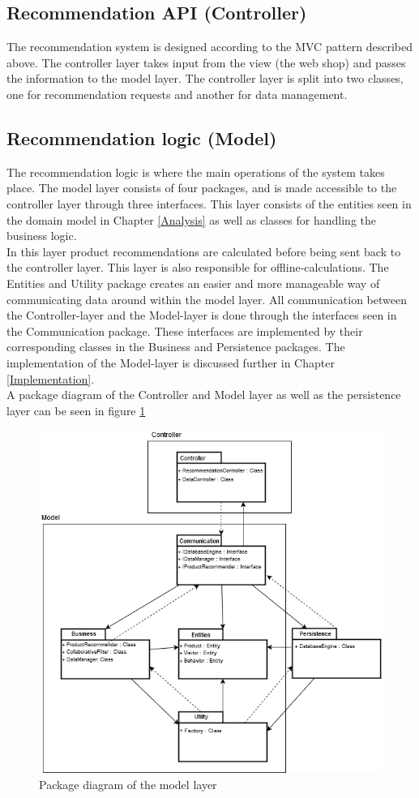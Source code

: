 \subsection{Recommendation \gls{API} (Controller)}
The recommendation system is designed according to the MVC pattern described above. The controller layer takes input from the view (the web shop) and passes the information to the model layer. The controller layer is split into two classes, one for recommendation requests and another for data management.

\subsection{Recommendation logic (Model)}
The recommendation logic is where the main operations of the system takes place. The model layer consists of four packages, and is made accessible to the controller layer through three interfaces. This layer consists of the entities seen in the domain model in Chapter \ref{Analysis} as well as classes for handling the business logic. \\In this layer product recommendations are calculated before being sent back to the controller layer. This layer is also responsible for offline-calculations. The Entities and Utility package creates an easier and more manageable way of communicating data around within the model layer. All communication between the Controller-layer and the Model-layer is done through the interfaces seen in the Communication package. These interfaces are implemented by their corresponding classes in the Business and Persistence packages. The implementation of the Model-layer is discussed further in Chapter \ref{Implementation}. \\
A package diagram of the Controller and Model layer as well as the persistence layer can be seen in figure \ref{fig:PackageDiagram}

\begin{figure}[H]
	\centering
	\includegraphics[width=.8\linewidth]{Figures/PackageDiagram.png}
	\caption{Package diagram of the model layer}
	\label{fig:PackageDiagram}
\end{figure}

